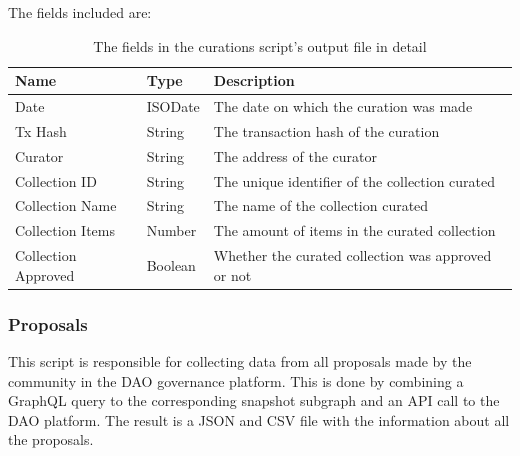 \documentclass[MSE,Master,english]{twbook}%
\begin{document}
The fields included are:
\begin{table}[H]
  \centering
  \begin{tabularx}{\textwidth}{|l|l|X|}
  \hline
  \textbf{Name}       & \textbf{Type} & \textbf{Description}                               \\ \hline
  Date                & ISODate       & The date on which the curation was made            \\ \hline
  Tx Hash             & String        & The transaction hash of the curation               \\ \hline
  Curator             & String        & The address of the curator                         \\ \hline
  Collection ID       & String        & The unique identifier of the collection curated    \\ \hline
  Collection Name     & String        & The name of the collection curated                 \\ \hline
  Collection Items    & Number        & The amount of items in the curated collection      \\ \hline
  Collection Approved & Boolean       & Whether the curated collection was approved or not \\ \hline
  \end{tabularx}
  \caption{The fields in the curations script's output file in detail}
  \label{table:curations}
  \end{table}


\subsubsection{Proposals\label{proposals-script}}
This script is responsible for collecting data from all proposals made by the community in the DAO governance platform. This is done by combining a GraphQL query to the corresponding snapshot subgraph and an API call to the DAO platform. The result is a JSON and CSV file with the information about all the proposals. \\
\end{document}
